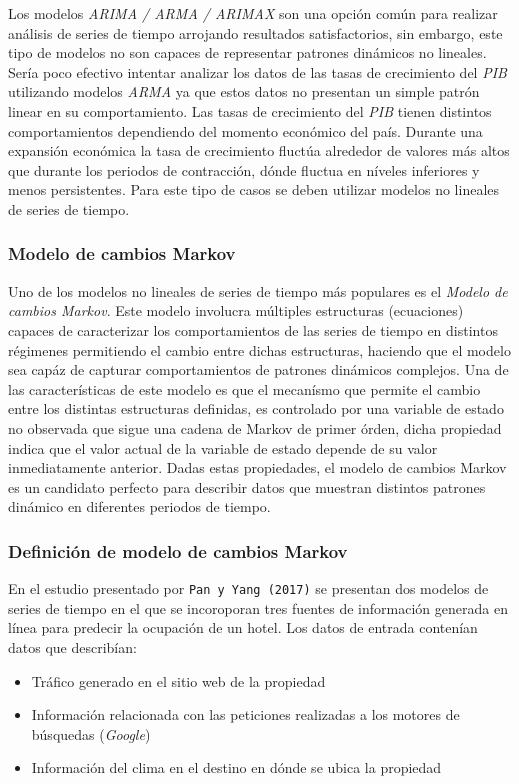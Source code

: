 {Los modelos \emph{ARIMA / ARMA / ARIMAX} son una opción común para realizar análisis de series de tiempo arrojando resultados satisfactorios, sin embargo, este tipo de modelos no son capaces de representar patrones dinámicos no lineales. Sería poco efectivo intentar analizar los datos de las tasas de crecimiento del \emph{PIB} utilizando modelos \emph{ARMA} ya que estos datos no presentan un simple patrón linear en su comportamiento. Las tasas de crecimiento del \emph{PIB} tienen distintos comportamientos dependiendo del momento económico del país. Durante una expansión económica la tasa de crecimiento fluctúa alrededor de valores más altos que durante los periodos de contracción, dónde fluctua en níveles inferiores y menos persistentes. Para este tipo de casos se deben utilizar modelos no lineales de series de tiempo.

\subsubsection*{Modelo de cambios Markov}

Uno de los modelos no lineales de series de tiempo más populares es el \emph{Modelo de cambios Markov}. Este modelo involucra múltiples estructuras (ecuaciones) capaces de caracterizar los comportamientos de las series de tiempo en distintos régimenes permitiendo el cambio entre dichas estructuras, haciendo que el modelo sea capáz de capturar comportamientos de patrones dinámicos complejos. Una de las características de este modelo es que el mecanísmo que permite el cambio entre los distintas estructuras definidas, es controlado por una variable de estado no observada que sigue una cadena de Markov de primer órden, dicha propiedad indica que el valor actual de la variable de estado depende de su valor inmediatamente anterior. Dadas estas propiedades, el modelo de cambios Markov es un candidato perfecto para describir datos que muestran distintos patrones dinámico en diferentes periodos de tiempo.

\subsubsection*{Definición de modelo de cambios Markov}


En el estudio presentado por \texttt{Pan y Yang (2017)} se presentan dos modelos de series de tiempo en el que se incoroporan tres fuentes de información generada en línea para predecir la ocupación de un hotel. Los datos de entrada contenían datos que describían:
\begin{itemize}
  \item Tráfico generado en el sitio web de la propiedad
  \item Información relacionada con las peticiones realizadas a los motores de búsquedas (\emph{Google})
  \item Información del clima en el destino en dónde se ubica la propiedad
\end{itemize}


}
